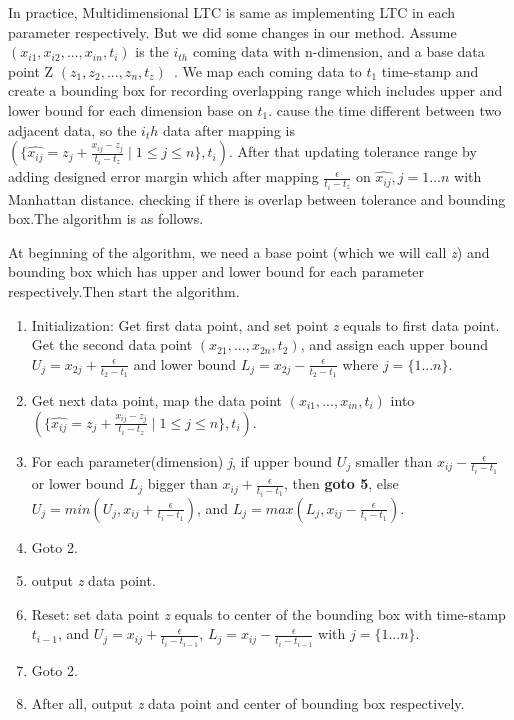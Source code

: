 \documentclass[10pt, conference, compsocconf]{IEEEtran}
\begin{document}
In practice, Multidimensional LTC is same as implementing LTC in each
parameter respectively. But we did some changes in our method. Assume
$(x_{i1}, x_{i2}, ..., x_{in},t_i)$ is the $i_{th}$ coming data with
n-dimension, and a base data point Z  $(z_{1}, z_{2}, ...,
z_{n},t_z)$~\cite{schoellhammer2004lightweight}. We map each coming
data to $t_1$ time-stamp and create a bounding box for recording
overlapping range which includes upper and lower bound for each
dimension base on $t_1$. cause the time different between two adjacent
data, so the $i_th$ data after mapping is $(\{\hat{x_{ij}}=z_j +
\frac{x_{ij}-z_{j}}{t_i-t_z} \mid1\leqslant{j}\leqslant{n}\},t_i)$.
After that updating tolerance range by adding designed error margin
which after mapping $\frac{\epsilon}{t_i-t_z}$ on $\hat{x_{ij}},
j={1...n}$ with Manhattan distance. checking if there is overlap
between tolerance and bounding box.The algorithm is as follows.

At beginning of the algorithm, we need a base point (which we will call
\textit{z}) and bounding box which has upper and lower bound for each
parameter respectively.Then start the algorithm.
\begin{enumerate}
  \item Initialization: Get first data point, and set point \textit{z} equals to first data point. Get the second data point $(x_{21},...,x_{2n},t_2)$, and assign each upper bound $U_j = x_{2j}+\frac{\epsilon}{t_2-t_1}$ and lower bound $L_j = x_{2j}-\frac{\epsilon}{t_2-t_1}$ where $j=\{1...n\}$.
  \item Get next data point, map the data point $(x_{i1},...,x_{in},t_i)$ into $(\{\hat{x_{ij}}=z_j + \frac{x_{ij}-z_{j}}{t_i-t_z} \mid1\leqslant{j}\leqslant{n}\},t_i)$.
  \item For each parameter(dimension) \textit{j}, if upper bound $U_j$ smaller than $x_{ij}-\frac{\epsilon}{t_i-t_1}$ or lower bound $L_j$ bigger than $x_{ij}+\frac{\epsilon}{t_i-t_1}$, then \textbf{goto 5}, else $U_j = min(U_j, x_{ij}+\frac{\epsilon}{t_i-t_1})$, and $L_j = max(L_j, x_{ij}-\frac{\epsilon}{t_i-t_1})$.
  \item Goto 2.
  \item output \textit{z} data point.
  \item Reset: set data point \textit{z} equals to center of the bounding box with time-stamp $t_{i-1}$, and $U_j=x_{ij}+\frac{\epsilon}{t_i-t_{i-1}}$, $L_j =x_{ij}-\frac{\epsilon}{t_i-t_{i-1}}$ with $j=\{1...n\}$.
  \item Goto 2.
  \item After all, output \textit{z} data point and center of bounding box respectively.
\end{enumerate}
\end{document}
